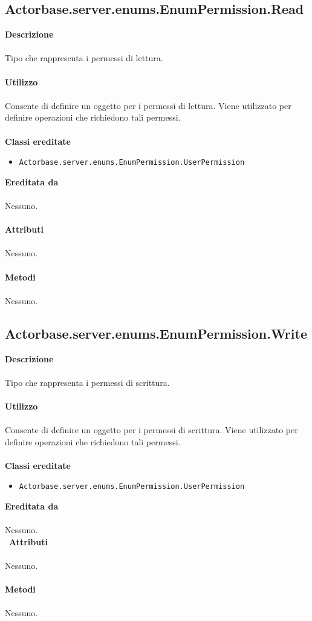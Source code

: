 \documentclass[a4paper]{article}
\begin{document}
			
	\subsection{Actorbase.server.enums.EnumPermission.Read}
		\textbf{Descrizione}
			\\ \\
			Tipo che rappresenta i permessi di lettura.
			\\ \\
		\textbf{Utilizzo}
			\\ \\
			Consente di definire un oggetto per i permessi di lettura. Viene utilizzato per definire operazioni che richiedono tali permessi.
			\\ \\
		\textbf{Classi ereditate}
			\begin{itemize}
				\item \texttt{Actorbase.server.enums.EnumPermission.UserPermission}
			\end{itemize}
		\textbf{Ereditata da}
			\\ \\
			Nessuno.
			\\ \\
		\textbf{Attributi}
		\\ \\
			Nessuno.
		\\ \\
		\textbf{Metodi}
			\\ \\
			Nessuno.
			
	\subsection{Actorbase.server.enums.EnumPermission.Write}
		\textbf{Descrizione}
			\\ \\
				Tipo che rappresenta i permessi di scrittura.
			\\ \\
		\textbf{Utilizzo}
			\\ \\
			Consente di definire un oggetto per i permessi di scrittura. Viene utilizzato per definire operazioni che richiedono tali permessi.
			\\ \\
		\textbf{Classi ereditate}
			\begin{itemize}
				\item \texttt{Actorbase.server.enums.EnumPermission.UserPermission}
			\end{itemize}
		\textbf{Ereditata da}
		\\ \\
		Nessuno.
		\\ \
		\textbf{Attributi}
		\\ \\
			Nessuno.
		\\ \\
		\textbf{Metodi}
			\\ \\
			Nessuno.
			
\end{document}
